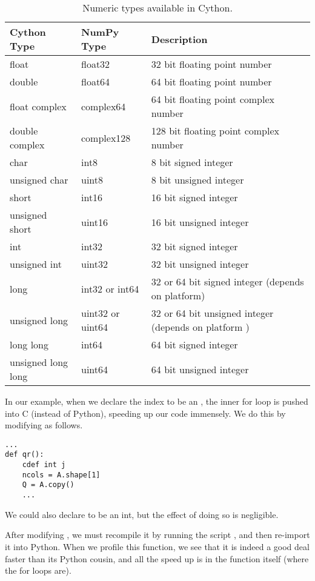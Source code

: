 \begin{table}
\begin{center}
\begin{tabular}{|p{2.8cm}|p{2.5cm}|p{6cm}|}
\hline
Cython Type & NumPy Type& Description \\
\hline
float & float32 & 32 bit floating point number \\
double & float64 & 64 bit floating point number \\
float complex & complex64 & 64 bit floating point complex number \\
double complex & complex128 & 128 bit floating point complex number \\
char & int8 & 8 bit signed integer \\
unsigned char & uint8 & 8 bit unsigned integer \\
short & int16 & 16 bit signed integer \\
unsigned short & uint16 & 16 bit unsigned integer \\
int & int32 & 32 bit signed integer \\
unsigned int & uint32 & 32 bit unsigned integer \\
long & int32 or int64 & 32 or 64 bit signed integer (depends on platform) \\
unsigned long & uint32 or uint64 & 32 or 64 bit unsigned integer (depends on platform ) \\
long long & int64 & 64 bit signed integer \\
unsigned long long & uint64 & 64 bit unsigned integer \\
\hline
\end{tabular}
\end{center}
\caption{Numeric types available in Cython.}
\label{table:cython_types}
\end{table}

In our example, when we declare the index  to be an , the inner for loop is pushed into C (instead of Python), speeding up our code immensely.
We do this by modifying  as follows.
\begin{lstlisting}
...
def qr():
    cdef int j
    ncols = A.shape[1]
    Q = A.copy()
    ...
\end{lstlisting}

We could also declare  to be an int, but the effect of doing so is negligible.

After modifying , we must recompile it by running the script , and then re-import it into Python.
When we profile this function, we see that it is indeed a good deal faster than its Python cousin, and all the speed up is in the function itself (where the for loops are).

